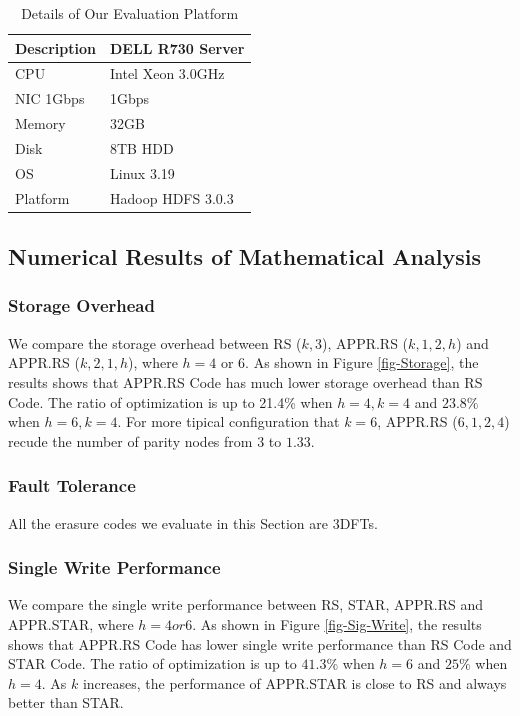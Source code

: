 \documentclass[sigconf]{acmart}
\begin{document}
\begin{table}[!ht]
\begin{tabular}{|l|l|}
\hline
Description & DELL R730 Server \\ \hline
CPU & Intel Xeon 3.0GHz \\ \hline
NIC 1Gbps & 1Gbps \\ \hline
Memory & 32GB \\ \hline
Disk & 8TB HDD \\ \hline
OS & Linux 3.19 \\ \hline
Platform & Hadoop HDFS 3.0.3 \\ \hline
\end{tabular}
\caption{Details of Our Evaluation Platform}\label{tab-platform}
\end{table}

\subsection{Numerical Results of Mathematical Analysis}
\subsubsection{Storage Overhead}
We compare the storage overhead between RS ($k,3$), APPR.RS ($k,1,2,h$) and APPR.RS ($k,2,1,h$), where $h = 4$ or $6$.
As shown in Figure \ref{fig-Storage}, the results shows that APPR.RS Code has much lower storage overhead than RS Code. The ratio of optimization is up to 21.4\% when $h=4, k=4$ and $23.8\%$ when $h=6, k=4$. For more tipical configuration that $k=6$, APPR.RS ($6,1,2,4$) recude the number of parity nodes from $3$ to $1.33$.

\subsubsection{Fault Tolerance}
All the erasure codes we evaluate in this Section are 3DFTs.

\subsubsection{Single Write Performance}
We compare the single write performance between RS, STAR, APPR.RS and APPR.STAR, where $h = 4 or 6$. As shown in Figure \ref{fig-Sig-Write}, the results shows that APPR.RS Code has lower single write performance than RS Code and STAR Code. The ratio of optimization is up to $41.3\%$ when $h=6$ and $25\%$ when $h=4$. As $k$ increases, the performance of APPR.STAR is close to RS and always better than STAR.
\end{document}
